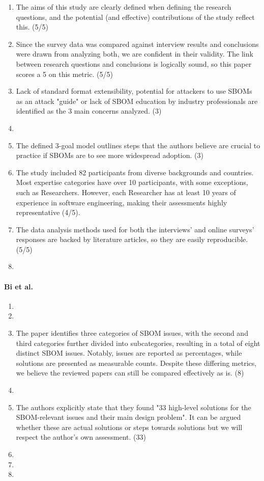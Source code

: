\begin{enumerate}
    \item The aims of this study are clearly defined when defining the research questions, and the potential (and effective) contributions of the study reflect this. (5/5)
    \item Since the survey data was compared against interview results and conclusions were drawn from analyzing both, we are confident in their validity. The link between research questions and conclusions is logically sound, so this paper scores a 5 on this metric. (5/5)
    \item Lack of standard format extensibility, potential for attackers to use SBOMs as an attack "guide" or lack of SBOM education by industry professionals are identified as the 3 main concerns analyzed. (3)
    \item %
    \item The defined 3-goal model outlines steps that the authors believe are crucial to practice if SBOMs are to see more widespread adoption. (3)
    \item The study included 82 participants from diverse backgrounds and countries. Most expertise categories have over 10 participants, with some exceptions, such as Researchers. However, each Researcher has at least 10 years of experience in software engineering, making their assessments highly representative (4/5).
    \item The data analysis methods used for both the interviews' and online surveys' responses are backed by literature articles, so they are easily reproducible. (5/5)
    \item %
\end{enumerate}

\paragraph{Bi et al. \cite{article:sboms-issues-solutions}}

\begin{enumerate}
    \item
    \item
    \item The paper identifies three categories of SBOM issues, with the second and third categories further divided into subcategories, resulting in a total of eight distinct SBOM issues. Notably, issues are reported as percentages, while solutions are presented as measurable counts. Despite these differing metrics, we believe the reviewed papers can still be compared effectively as is. (8)
    \item
    \item The authors explicitly state that they found "33 high-level solutions for the SBOM-relevant issues and their main design problem". It can be argued whether these are actual solutions or steps towards solutions but we will respect the author's own assessment. (33)
    \item
    \item
    \item
\end{enumerate}

